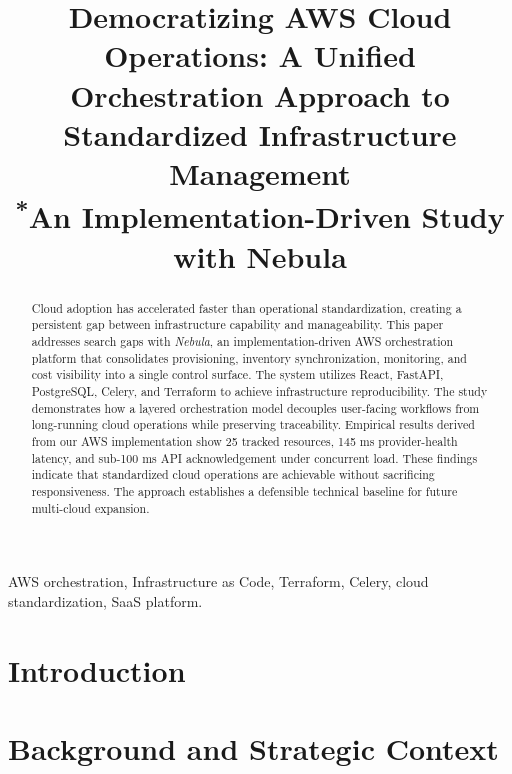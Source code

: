 \documentclass[11pt,conference,onecolumn]{IEEEtran}
\begin{document}
\title{Democratizing AWS Cloud Operations: A Unified Orchestration Approach to Standardized Infrastructure Management\\
{\footnotesize \textsuperscript{*}An Implementation-Driven Study with Nebula}
}

\author{
}

\maketitle

\begin{abstract}
Cloud adoption has accelerated faster than operational standardization, creating a persistent gap between infrastructure capability and manageability. This paper addresses search gaps with \textit{Nebula}, an implementation-driven AWS orchestration platform that consolidates provisioning, inventory synchronization, monitoring, and cost visibility into a single control surface. The system utilizes React, FastAPI, PostgreSQL, Celery, and Terraform to achieve infrastructure reproducibility. The study demonstrates how a layered orchestration model decouples user-facing workflows from long-running cloud operations while preserving traceability. Empirical results derived from our AWS implementation show 25 tracked resources, 145 ms provider-health latency, and sub-100 ms API acknowledgement under concurrent load. These findings indicate that standardized cloud operations are achievable without sacrificing responsiveness. The approach establishes a defensible technical baseline for future multi-cloud expansion.
\end{abstract}

\begin{IEEEkeywords}
AWS orchestration, Infrastructure as Code, Terraform, Celery, cloud standardization, SaaS platform.
\end{IEEEkeywords}

\section{Introduction}


\section{Background and Strategic Context}

\end{document}
